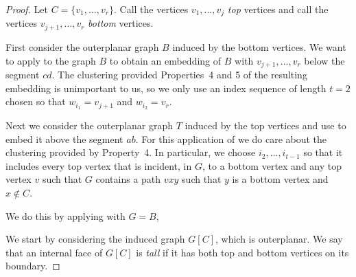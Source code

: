 \documentclass{patmorin}
\begin{document}
\begin{proof}
  Let $C=\{v_1,\ldots,v_r\}$. Call the vertices $v_1,\ldots,v_j$ \emph{top} vertices and call the vertices $v_{j+1},\ldots,v_r$ \emph{bottom} vertices.

  First consider the outerplanar graph $B$ induced by the bottom
  vertices. We want to apply  to the graph
  $B$ to obtain an embedding of $B$ with $v_{j+1},\ldots,v_{r}$
  below the segment $cd$.  The clustering provided Properties~4 and
  5 of the resulting embedding is unimportant to us, so we only use
  an index sequence of length $t=2$ chosen so that $w_{i_1}=v_{j+1}$
  and $w_{i_2}=v_r$.

  Next we consider the outerplanar graph $T$ induced by the top vertices
  and use  to embed it above the segment $ab$.
  For this application of  we do care about
  the clustering provided by Property~4. In particular, we choose
  $i_2,\ldots,i_{t-1}$ so that it includes every top vertex that is 
  incident, in $G$, to a bottom vertex and any top vertex $v$ such that $G$
  contains a path $vxy$ such that $y$ is a bottom vertex and $x\not\in C$.


We do this by applying  with $G=B$, 

  We start by considering the induced graph $G[C]$, which is outerplanar.
  We say that an internal face of $G[C]$ is \emph{tall} if it has both
  top and bottom vertices on its boundary. 

\end{proof}
\end{document}
